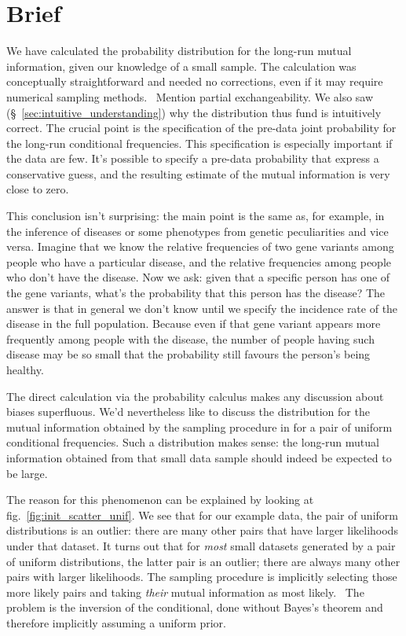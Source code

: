 \documentclass[\ifafour a4paper,12pt,\else a5paper,10pt,\fi%
onecolumn,oneside,article,%
british%
]{memoir}
\theoremstyle{remark}
\theoremstyle{innote}
\newcommand*{\citep}{\parencites}
\renewcommand*{\|}{\nonscript\,\vert\nonscript\;\mathopen{}}
\newcommand*{\sect}{\S}%
\newcommand*{\fig}{fig.}%
\newcommand*{\puzzle}{{\fontencoding{U}\fontfamily{fontawesometwo}\selectfont\symbol{225}}}
\newcommand{\mynote}[1]{ {\color{notecolour}\puzzle\ #1}}
\begin{document}
\section{Brief}
\label{sec:discussion}


We have calculated the probability distribution for the long-run mutual
information, given our knowledge of a small sample. The calculation was
conceptually straightforward and needed no corrections, even if it may
require numerical sampling methods. \mynote{Mention partial
  exchangeability.} We also saw (\sect~\ref{sec:intuitive_understanding})
why the distribution thus fund is intuitively correct. The crucial point is
the specification of the pre-data joint probability for the long-run
conditional frequencies. This specification is especially important if the
data are few. It's possible to specify a pre-data probability that express
a conservative guess, and the resulting estimate of the mutual information
is very close to zero.

This conclusion isn't surprising: the main point is the same as, for
example, in the inference of diseases or some phenotypes from genetic
peculiarities and vice versa. Imagine that we know the relative frequencies
of two gene variants among people who have a particular disease, and the
relative frequencies among people who don't have the disease. Now we ask:
given that a specific person has one of the gene variants, what's the
probability that this person has the disease? The answer is that in general
we don't know until we specify the incidence rate of the disease in the
full population. Because even if that gene variant appears more frequently among
people with the disease, the number of people having such disease may be so
small that the probability still favours the person's being healthy.

The direct calculation via the probability calculus
\citep{jaynes1994_r2003,soxetal1988_r2013,hailperin1996} makes any
discussion about biases superfluous. We'd nevertheless like to discuss the
distribution for the mutual information obtained by the sampling procedure
in \citep{panzerietal2007} for a pair of uniform conditional frequencies.
Such a distribution makes sense: the long-run mutual information obtained
from that small data sample should indeed be expected to be large.

The reason for this phenomenon can be explained by looking at
\fig~\ref{fig:init_scatter_unif}. We see that for our example data, the
pair of uniform distributions is an outlier: there are many other pairs
that have larger likelihoods under that dataset. It turns out that for
\emph{most} small datasets generated by a pair of uniform distributions,
the latter pair is an outlier; there are always many other pairs with
larger likelihoods. The sampling procedure is implicitly selecting those
more likely pairs and taking \emph{their} mutual information as most
likely. \mynote{The problem is the inversion of the conditional, done
  without Bayes's theorem and therefore implicitly assuming a uniform prior.}
\end{document}
